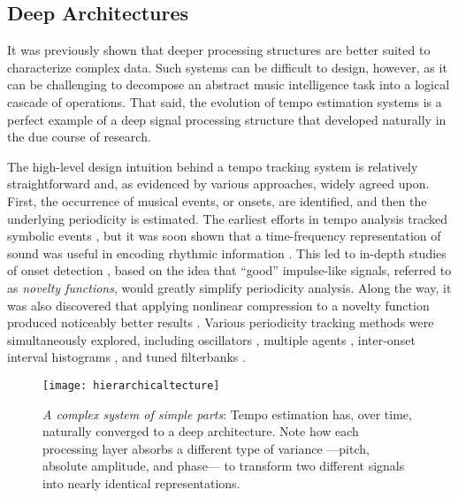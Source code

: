 \subsection{Deep Architectures}
\label{subsec:deep_architectures}

It was previously shown that deeper processing structures are better suited to characterize complex data.
Such systems can be difficult to design, however, as it can be challenging to decompose an abstract music intelligence task into a logical cascade of operations.
That said, the evolution of tempo estimation systems is a perfect example of a deep signal processing structure that developed naturally in the due course of research.

The high-level design intuition behind a tempo tracking system is relatively straightforward and, as evidenced by various approaches, widely agreed upon.
First, the occurrence of musical events, or onsets, are identified, and then the underlying periodicity is estimated.
The earliest efforts in tempo analysis tracked symbolic events \cite{Dannenberg1984Online}, but it was soon shown that a time-frequency representation of sound was useful in encoding rhythmic information \cite{Scheirer1998Tempo}.
This led to in-depth studies of onset detection \cite{Bello2005Tutorial}, based on the idea that ``good'' impulse-like signals, referred to as \emph{novelty functions}, would greatly simplify periodicity analysis.
Along the way, it was also discovered that applying nonlinear compression to a novelty function produced noticeably better results \cite{Klapuri2006Analysis}.
Various periodicity tracking methods were simultaneously explored, including oscillators \cite{Large1994Resonance}, multiple agents \cite{Goto1995Realtime}, inter-onset interval histograms \cite{Dixon2007Evaluation}, and tuned filterbanks \cite{Grosche2011Extracting}.

\begin{figure}
\begin{centering}
\texttt{[image: hierarchicaltecture]}
\caption{\emph{A complex system of simple parts}: Tempo estimation has, over time, naturally converged to a deep architecture. Note how each processing layer absorbs a different type of variance ---pitch, absolute amplitude, and phase--- to transform two different signals into nearly identical representations.}
\label{fig:hierarchicaltecture}
\end{centering}
\end{figure}

